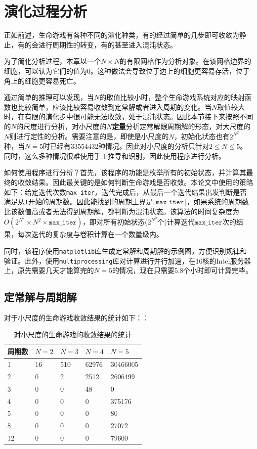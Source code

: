 \documentclass[a4paper,12pt]{report}
\begin{document}
\section{演化过程分析}

正如前述，生命游戏有各种不同的演化种类，有的经过简单的几步即可收敛为静止，有的会进行周期性的转变，有的甚至进入混沌状态。

为了简化分析过程，本章以一个$N \times N$的有限网格作为分析对象。在该网格边界的细胞，可以认为它们的值为0。这种做法会导致位于边上的细胞更容易存活，位于角上的细胞更容易死亡。

通过简单的推理可以发现，当$N$的取值比较小时，整个生命游戏系统对应的映射函数也比较简单，应该比较容易收敛到定常解或者进入周期的变化。当$N$取值较大时，在有限的演化步中很可能无法收敛，处于混沌状态。因此本节接下来按照不同的$N$的尺度进行分析，对小尺度的$N$\textbf{定量}分析定常解跟周期解的形态，对大尺度的$N$则进行定性的分析。需要注意的是，即使是小尺度的$N$，初始化状态也有$2^{N^2}$种，当$N=5$时已经有$33554432$种情况。因此对小尺度的分析只针对$2 \leq N \leq 5$。同时，这么多种情况很难使用手工推导和识别，因此使用程序进行分析。

如何使用程序进行分析？首先，该程序的功能是枚举所有的初始状态，并计算其最终的收敛结果。因此最关键的是如何判断生命游戏是否收敛。本论文中使用的策略如下：给定迭代次数\texttt{max\_iter}，迭代完成后，从最后一个迭代结果出发判断是否满足从$1$开始的周期数。因此能找到的周期上界是$\lfloor \mathtt{max\_iter} \rfloor$，如果系统的周期数比该数值高或者无法得到周期解，都判断为混沌状态。该算法的时间复杂度为$O(2^{N^2} \times N^2 \times \mathtt{max\_iter})$，即对所有初始状态($2^{N^2}$个)计算迭代$\mathtt{max\_iter}$次的结果，每次迭代的复杂度与卷积计算在一个数量级内。

同时，该程序使用\texttt{matplotlib}库生成定常解和周期解的示例图，方便识别规律和验证。此外，使用\texttt{multiprocessing}库对计算进行并行加速，在16核的Intel服务器上，原先需要几天才能算完的$N=5$的情况，现在只需要5.8个小时即可计算完毕。

\subsection{定常解与周期解}

对于小尺度的生命游戏收敛结果的统计如下：：
\begin{table}[!ht]
\centering
\begin{tabular}{|l|l|l|l|l|}
\hline
周期数 & $N=2$ & $N=3$ & $N=4$ & $N=5$ \\ \hline
1      & 16    & 510   & 62976 & 30466005 \\ \hline
2      & 0     & 2     & 2512  & 2606499 \\ \hline
3      & 0     & 0     & 48    & 0       \\ \hline
4      & 0     & 0     & 0     & 375176  \\ \hline
5      & 0     & 0     & 0     & 80      \\ \hline
8      & 0     & 0     & 0     & 27072   \\ \hline
12     & 0     & 0     & 0     & 79600   \\ \hline
\end{tabular}
\label{table:stats}
\caption{对小尺度的生命游戏的收敛结果的统计}
\end{table}
\end{document}
